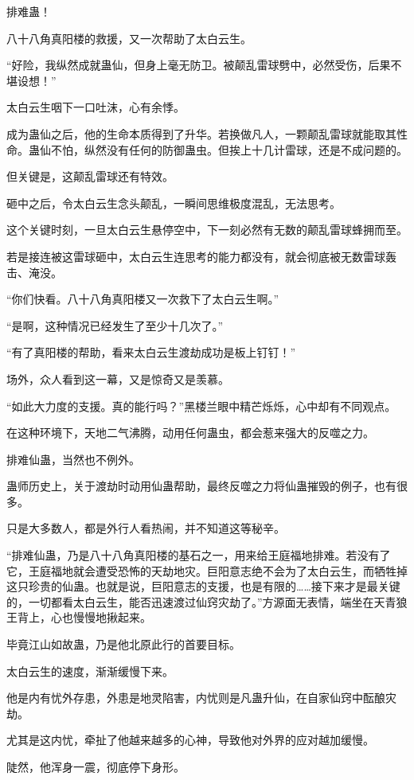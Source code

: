 \begin{this_body}
排难蛊！

八十八角真阳楼的救援，又一次帮助了太白云生。

“好险，我纵然成就蛊仙，但身上毫无防卫。被颠乱雷球劈中，必然受伤，后果不堪设想！”

太白云生咽下一口吐沫，心有余悸。

成为蛊仙之后，他的生命本质得到了升华。若换做凡人，一颗颠乱雷球就能取其性命。蛊仙不怕，纵然没有任何的防御蛊虫。但挨上十几计雷球，还是不成问题的。

但关键是，这颠乱雷球还有特效。

砸中之后，令太白云生念头颠乱，一瞬间思维极度混乱，无法思考。

这个关键时刻，一旦太白云生悬停空中，下一刻必然有无数的颠乱雷球蜂拥而至。

若是接连被这雷球砸中，太白云生连思考的能力都没有，就会彻底被无数雷球轰击、淹没。

“你们快看。八十八角真阳楼又一次救下了太白云生啊。”

“是啊，这种情况已经发生了至少十几次了。”

“有了真阳楼的帮助，看来太白云生渡劫成功是板上钉钉！”

场外，众人看到这一幕，又是惊奇又是羡慕。

“如此大力度的支援。真的能行吗？”黑楼兰眼中精芒烁烁，心中却有不同观点。

在这种环境下，天地二气沸腾，动用任何蛊虫，都会惹来强大的反噬之力。

排难仙蛊，当然也不例外。

蛊师历史上，关于渡劫时动用仙蛊帮助，最终反噬之力将仙蛊摧毁的例子，也有很多。

只是大多数人，都是外行人看热闹，并不知道这等秘辛。

“排难仙蛊，乃是八十八角真阳楼的基石之一，用来给王庭福地排难。若没有了它，王庭福地就会遭受恐怖的天劫地灾。巨阳意志绝不会为了太白云生，而牺牲掉这只珍贵的仙蛊。也就是说，巨阳意志的支援，也是有限的……接下来才是最关键的，一切都看太白云生，能否迅速渡过仙窍灾劫了。”方源面无表情，端坐在天青狼王背上，心也慢慢地揪起来。

毕竟江山如故蛊，乃是他北原此行的首要目标。

太白云生的速度，渐渐缓慢下来。

他是内有忧外存患，外患是地灵陷害，内忧则是凡蛊升仙，在自家仙窍中酝酿灾劫。

尤其是这内忧，牵扯了他越来越多的心神，导致他对外界的应对越加缓慢。

陡然，他浑身一震，彻底停下身形。


\end{this_body}
